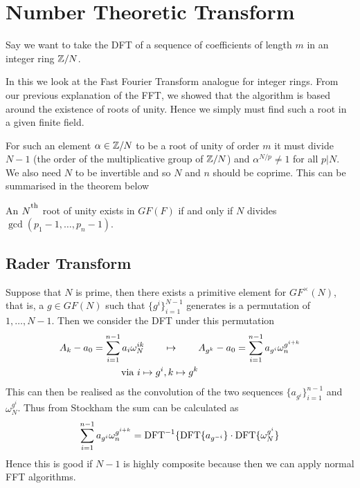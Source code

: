 \section{Number Theoretic Transform}
\label{sec:ntt}

Say we want to take the DFT of a sequence of coefficients of length $m$ in an integer ring ${\mathbb Z}/N$.

In this we look at the Fast Fourier Transform analogue for integer rings. From our previous explanation of the FFT, we showed that the algorithm is based around the existence of roots of unity. Hence we simply must find such a root in a given finite field.

For such an element $\alpha \in {\mathbb Z}/N$ to be a root of unity of order $m$ it must divide $N - 1$ (the order of the multiplicative group of ${\mathbb Z}/N$) and $\alpha^{N/p} \neq 1$ for all $p | N$. We also need $N$ to be invertible and so $N$ and $n$ should be coprime. This can be summarised in the theorem below

\begin{theorem}
  An $N^\textsuperscript{\textup{th}}$ root of unity exists in $GF(F)$ if and only if $N$ divides $\gcd(p_1 - 1, \ldots, p_n - 1)$.
\end{theorem}


\subsection{Rader Transform}
\label{subsec:rt}



Suppose that $N$ is prime, then there exists a primitive element for $GF^\times(N)$, that is, a $g \in GF(N)$ such that $\{g^i\}_{i=1}^{N-1}$ generates is a permutation of $1, \ldots, N-1$. Then we consider the DFT under this permutation
\begin{align*}
  A_k - a_0 = \sum^{n-1}_{i=1} a_i \omega_N^{ik} \qquad &\mapsto \qquad A_{g^k} - a_0 = \sum^{n-1}_{i=1} a_{g^i}\omega_n^{g^{i+k}}\\
  \textrm{ via } i \mapsto g^i&, k \mapsto g^k
\end{align*}
This can then be realised as the convolution of the two sequences $\{a_{g^i}\}_{i=1}^{n-1}$ and $\omega_N^{g^i}$. Thus from Stockham the sum can be calculated as
\[
  \sum^{n-1}_{i=1} a_{g^i}\omega_n^{g^{i+k}} = \textrm{DFT}^{-1}\{\textrm{DFT}\{a_{g^{-i}}\}\cdot \textrm{DFT}\{\omega_N^{g^i}\}
\]
Hence this is good if $N - 1$ is highly composite because then we can apply normal FFT algorithms.

